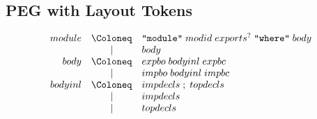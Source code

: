 \subsection{PEG with Layout Tokens}

\begin{align*}
  \begin{array}{rcl}
    {module}
    & \Coloneq & \text{\texttt{\textquotedbl module\textquotedbl}}\; {modid}\; {exports}^?\; \text{\texttt{\textquotedbl where\textquotedbl}}\; {body} \\
    & \mid & {body} \\
    {body}
    & \Coloneq & {expbo}\; {bodyinl}\; {expbc} \\
    & \mid & {impbo}\; {bodyinl}\; {impbc} \\
    {bodyinl}
    & \Coloneq & {impdecls}\; ;\; {topdecls} \\
    & \mid & {impdecls} \\
    & \mid & {topdecls} \\
  \end{array}
\end{align*}

